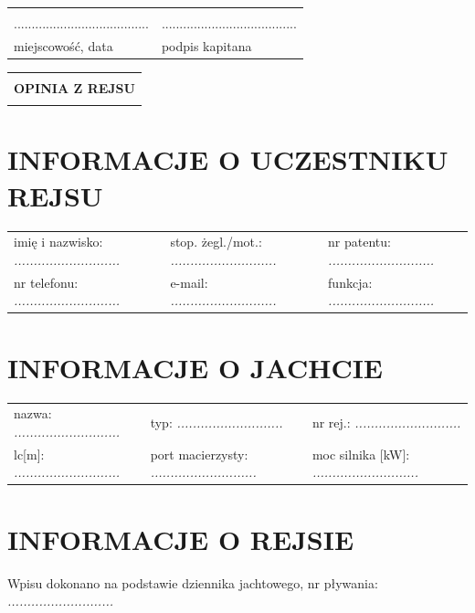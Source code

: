 \documentclass{article}
\begin{document}
\begin{tabularx}{\textwidth}{X X}
\\\\
...................................... & ......................................\\
miejscowość, data & podpis kapitana\\
\end{tabularx}
\newpage
\begin{tabularx}{\textwidth} { 
  | >{\centering\arraybackslash}X | }
 \hline
 \\
 \textbf{\huge OPINIA Z REJSU} \\
 \\
\hline
\end{tabularx}

\section*{INFORMACJE O UCZESTNIKU REJSU}
\begin{tabularx}{\textwidth}{X X X}
imię i nazwisko: \textit{...........................} & stop. żegl./mot.: \textit{...........................} & nr patentu: \textit{...........................} \\
nr telefonu: \textit{...........................} & e-mail: \textit{...........................} & funkcja: \textit{...........................} \\
\end{tabularx}

\section*{INFORMACJE O JACHCIE}

\begin{tabularx}{\textwidth}{X X X}
nazwa: \textit{...........................} & typ: \textit{...........................} & nr rej.: \textit{...........................} \\
lc[m]: \textit{...........................} & port macierzysty: \textit{...........................} & moc silnika [kW]: \textit{...........................} \\
\end{tabularx}

\section*{INFORMACJE O REJSIE}

Wpisu dokonano na podstawie dziennika jachtowego, nr pływania: \textit{...........................}
\\
\end{document}

